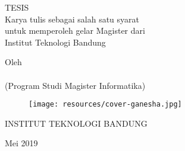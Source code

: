 \clearpage
\pagestyle{empty}

\begin{center}
\smallskip

    \singlespacing
    \large \bfseries \MakeUppercase{\thetitle}
    \vfill

    \large TESIS \\
    \bigskip
    \normalsize Karya tulis sebagai salah satu syarat\\
    untuk memperoleh gelar Magister dari\\
    Institut Teknologi Bandung
    \vfill

    \normalsize Oleh\\
    \large \theauthor\\
    (Program Studi Magister Informatika)


    \vfill
    \begin{figure}[h]
        \centering
      	\texttt{[image: resources/cover-ganesha.jpg]}
    \end{figure}
    \vfill

    \large
    \uppercase{
        Institut Teknologi Bandung
    }

    Mei 2019

\end{center}

\clearpage
